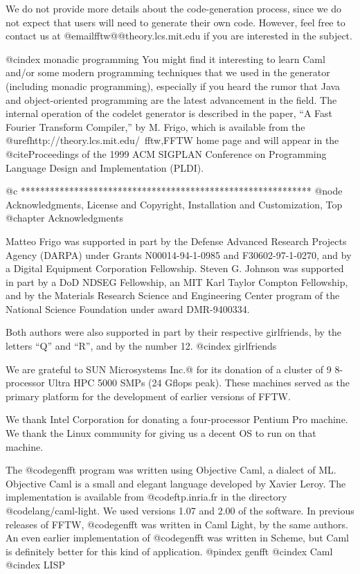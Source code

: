 We do not provide more details about the code-generation process, since
we do not expect that users will need to generate their own code.
However, feel free to contact us at @email{fftw@@theory.lcs.mit.edu} if
you are interested in the subject.  

@cindex monadic programming
You might find it interesting to learn Caml and/or some modern
programming techniques that we used in the generator (including monadic
programming), especially if you heard the rumor that Java and
object-oriented programming are the latest advancement in the field.
The internal operation of the codelet generator is described in the
paper, ``A Fast Fourier Transform Compiler,'' by M. Frigo, which is
available from the @uref{http://theory.lcs.mit.edu/~fftw,FFTW home page}
and will appear in the @cite{Proceedings of the 1999 ACM SIGPLAN
Conference on Programming Language Design and Implementation (PLDI)}.

@c ************************************************************
@node Acknowledgments, License and Copyright, Installation and Customization, Top
@chapter Acknowledgments

Matteo Frigo was supported in part by the Defense Advanced Research
Projects Agency (DARPA) under Grants N00014-94-1-0985 and
F30602-97-1-0270, and by a Digital Equipment Corporation Fellowship.
Steven G. Johnson was supported in part by a DoD NDSEG Fellowship, an
MIT Karl Taylor Compton Fellowship, and by the Materials Research
Science and Engineering Center program of the National Science
Foundation under award DMR-9400334.

Both authors were also supported in part by their respective
girlfriends, by the letters ``Q'' and ``R'', and by the number 12.
@cindex girlfriends

We are grateful to SUN Microsystems Inc.@ for its donation of a cluster
of 9 8-processor Ultra HPC 5000 SMPs (24 Gflops peak). These machines
served as the primary platform for the development of earlier versions
of FFTW.

We thank Intel Corporation for donating a four-processor Pentium Pro
machine.  We thank the Linux community for giving us a decent OS to run
on that machine.

The @code{genfft} program was written using Objective Caml, a dialect of
ML.  Objective Caml is a small and elegant language developed by Xavier
Leroy.  The implementation is available from @code{ftp.inria.fr} in the
directory @code{lang/caml-light}.  We used versions 1.07 and 2.00 of the
software.  In previous releases of FFTW, @code{genfft} was written in
Caml Light, by the same authors.  An even earlier implementation of
@code{genfft} was written in Scheme, but Caml is definitely better for
this kind of application.
@pindex genfft
@cindex Caml
@cindex LISP

